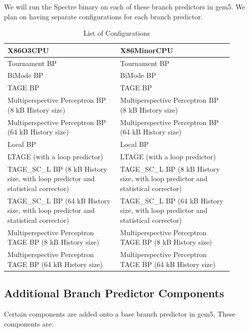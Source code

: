 \documentclass[twocolumn,showpacs,%
  nofootinbib,aps,superscriptaddress,%
  eqsecnum,prd,notitlepage,showkeys,10pt]{revtex4-1}
\begin{document}
We will run the Spectre binary on each of these branch predictors in gem5. We plan on having separate configurations for each branch predictor.

\begin{table}
\centering
\caption{List of Configurations}
\small
\begin{tabular}{p{0.45\linewidth}p{0.45\linewidth}}
\hline
X86O3CPU & X86MinorCPU \\
\hline
Tournament BP & Tournament BP \\
BiMode BP & BiMode BP \\
TAGE BP & TAGE BP \\
Multiperspective Perceptron BP (8 kB History size) & Multiperspective Perceptron BP (8 kB History size) \\
Multiperspective Perceptron BP (64 kB History size) & Multiperspective Perceptron BP (64 kB History size) \\
Local BP & Local BP \\
LTAGE (with a loop predictor) & LTAGE (with a loop predictor) \\
TAGE\_SC\_L BP (8 kB History size, with loop predictor and statistical corrector) & TAGE\_SC\_L BP (8 kB History size, with loop predictor and statistical corrector) \\
TAGE\_SC\_L BP (64 kB History size, with loop predictor and statistical corrector) & TAGE\_SC\_L BP (64 kB History size, with loop predictor and statistical corrector) \\
Multiperspective Perceptron TAGE BP (8 kB History size) & Multiperspective Perceptron TAGE BP (8 kB History size) \\
Multiperspective Perceptron TAGE BP (64 kB History size) & Multiperspective Perceptron TAGE BP (64 kB History size) \\
\hline
\end{tabular}
\end{table}

\subsection{Additional Branch Predictor Components}
Certain components are added onto a base branch predictor in gem5. These components are:
\end{document}
